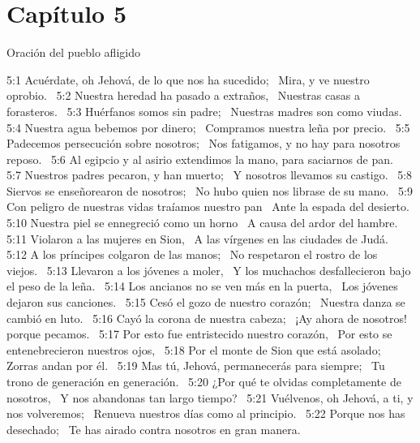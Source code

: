 \section*{Capítulo 5}
Oración del pueblo afligido  

5:1 Acuérdate, oh Jehová, de lo que nos ha sucedido;  
Mira, y ve nuestro oprobio.  
5:2 Nuestra heredad ha pasado a extraños,  
Nuestras casas a forasteros.  
5:3 Huérfanos somos sin padre;  
Nuestras madres son como viudas.  
5:4 Nuestra agua bebemos por dinero;  
Compramos nuestra leña por precio.  
5:5 Padecemos persecución sobre nosotros;  
Nos fatigamos, y no hay para nosotros reposo.  
5:6 Al egipcio y al asirio extendimos la mano, para saciarnos de pan.  
5:7 Nuestros padres pecaron, y han muerto;  
Y nosotros llevamos su castigo.  
5:8 Siervos se enseñorearon de nosotros;  
No hubo quien nos librase de su mano.  
5:9 Con peligro de nuestras vidas traíamos nuestro pan  
Ante la espada del desierto.  
5:10 Nuestra piel se ennegreció como un horno  
A causa del ardor del hambre.  
5:11 Violaron a las mujeres en Sion,  
A las vírgenes en las ciudades de Judá.  
5:12 A los príncipes colgaron de las manos;  
No respetaron el rostro de los viejos.  
5:13 Llevaron a los jóvenes a moler,  
Y los muchachos desfallecieron bajo el peso de la leña.  
5:14 Los ancianos no se ven más en la puerta,  
Los jóvenes dejaron sus canciones.  
5:15 Cesó el gozo de nuestro corazón;  
Nuestra danza se cambió en luto.  
5:16 Cayó la corona de nuestra cabeza;  
¡Ay ahora de nosotros! porque pecamos.  
5:17 Por esto fue entristecido nuestro corazón,  
Por esto se entenebrecieron nuestros ojos,  
5:18 Por el monte de Sion que está asolado;  
Zorras andan por él.  
5:19 Mas tú, Jehová, permanecerás para siempre;  
Tu trono de generación en generación.  
5:20 ¿Por qué te olvidas completamente de nosotros,  
Y nos abandonas tan largo tiempo?  
5:21 Vuélvenos, oh Jehová, a ti, y nos volveremos;  
Renueva nuestros días como al principio.  
5:22 Porque nos has desechado;  
Te has airado contra nosotros en gran manera.
